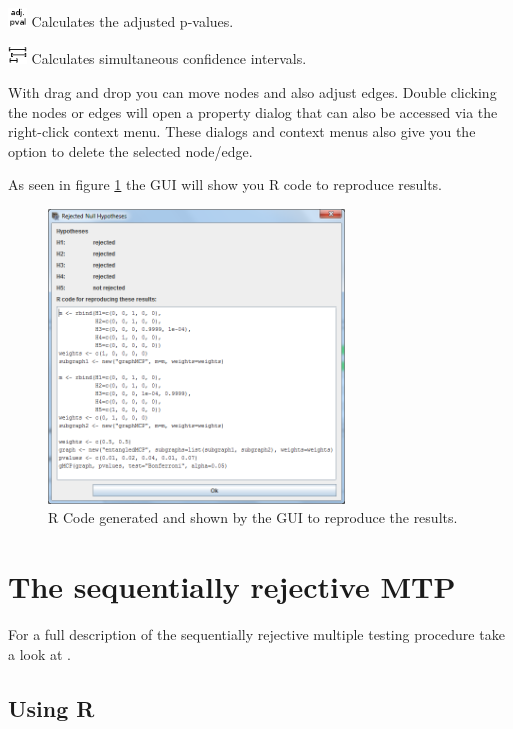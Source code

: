 \documentclass[a4paper, 10pt]{article}\usepackage[]{graphicx}\usepackage[]{color}
\numberwithin{equation}{section}
\theoremstyle{definition}
\theoremstyle{plain}
\begin{document}
\includegraphics[width=0.5cm]{pictures/adjPval.png} Calculates the
adjusted p-values.

\includegraphics[width=0.5cm]{pictures/confint2.png} Calculates
simultaneous confidence intervals.

With drag and drop you can move nodes and also adjust edges. Double
clicking the nodes or edges will open a property dialog that can also
be accessed via the right-click context menu. These dialogs and
context menus also give you the option to delete the selected
node/edge.

As seen in figure \ref{fig:guircode} the GUI will show you R code to
reproduce results.

\begin{figure}[ht]
  \centering   
  \includegraphics[width=0.7\textwidth]{pictures/GeneratedRCode.png}      
  \caption{\label{fig:guircode} R Code generated and shown by the GUI to reproduce the results.}
\end{figure}

\section{The sequentially rejective MTP}

For a full description of the sequentially rejective multiple testing
procedure take a look at \cite{bretzEtAl2009graphical}. 

\subsection{Using R}
\end{document}
